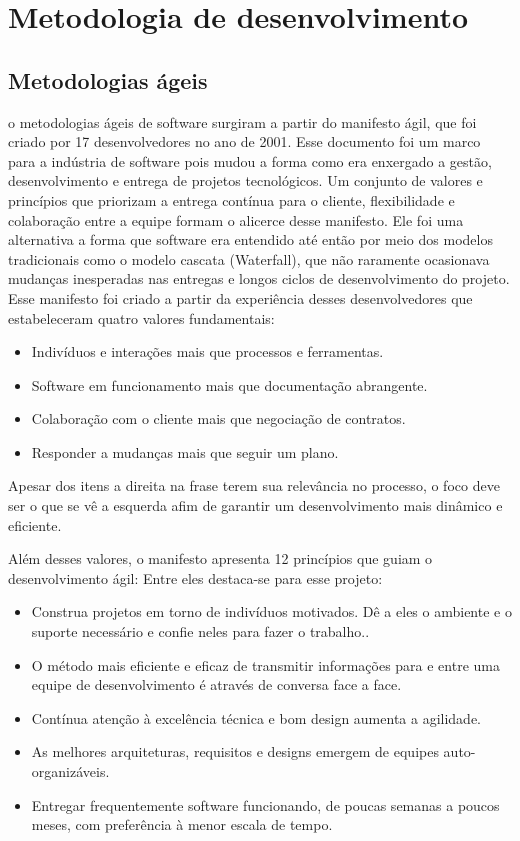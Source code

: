 \section{Metodologia de desenvolvimento}
\subsection{Metodologias ágeis}
o metodologias ágeis de software surgiram a partir do manifesto ágil, que foi criado por 17 desenvolvedores no ano de 2001. Esse documento foi um marco para a indústria de software pois mudou a forma como era enxergado a gestão, desenvolvimento e entrega de projetos tecnológicos. 
Um conjunto de valores e princípios que priorizam a entrega contínua para o cliente, flexibilidade e colaboração entre a equipe formam o alicerce desse manifesto. Ele foi uma alternativa a forma que software era entendido até então por meio dos modelos tradicionais como o modelo cascata (Waterfall), que não raramente ocasionava mudanças inesperadas nas entregas e longos ciclos de desenvolvimento do projeto. Esse manifesto foi criado a partir da experiência desses desenvolvedores que estabeleceram quatro valores fundamentais: 

\begin{itemize}
    \item Indivíduos e interações mais que processos e ferramentas.
    \item Software em funcionamento mais que documentação abrangente.
    \item Colaboração com o cliente mais que negociação de contratos.
    \item Responder a mudanças mais que seguir um plano.
\end{itemize}

Apesar dos itens a direita na frase terem sua relevância no processo, o foco deve ser o que se vê a esquerda afim de garantir um desenvolvimento mais dinâmico e eficiente.

Além desses valores, o manifesto apresenta 12 princípios que guiam o desenvolvimento ágil: Entre eles destaca-se para esse projeto:

\begin{itemize}
    \item Construa projetos em torno de indivíduos motivados. Dê a eles o ambiente e o suporte necessário e confie neles para fazer o trabalho..
    \item O método mais eficiente e eficaz de transmitir informações para e entre uma equipe de desenvolvimento é através de conversa face a face.
    \item Contínua atenção à excelência técnica e bom design aumenta a agilidade.
    \item As melhores arquiteturas, requisitos e designs emergem de equipes auto-organizáveis.
    \item Entregar frequentemente software funcionando, de poucas semanas a poucos meses, com preferência à menor escala de tempo.
\end{itemize}

